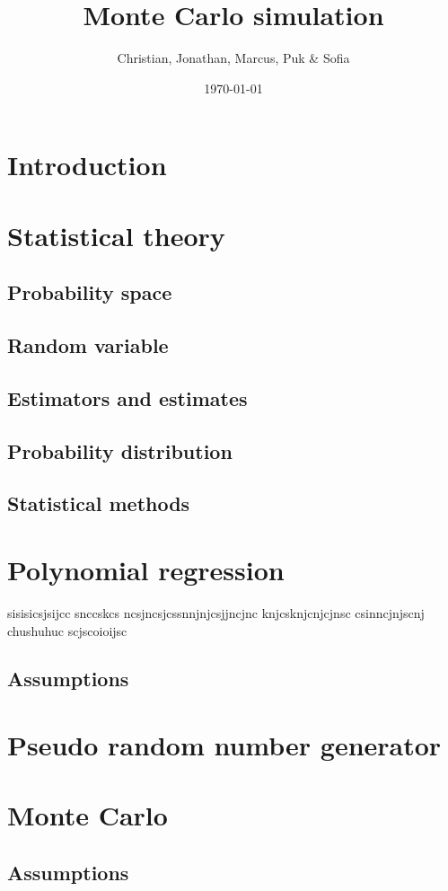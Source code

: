 \documentclass{article}
\title{Monte Carlo simulation}
\author{Christian, Jonathan, Marcus, Puk & Sofia }
\date{\today}
\begin{document}
	\maketitle
	\newpage
	\tableofcontents
	\newpage
	\section{Introduction}
	\newpage
	\section{Statistical theory}
	\subsection{Probability space}
	\subsection{Random variable}
	\subsection{Estimators and estimates}
	\subsection{Probability distribution}
	\subsection{Statistical methods}
	\newpage
	\section{Polynomial regression}
 	sisisicsjsijcc snccskcs ncsjncsjcssnnjnjcsjjncjnc knjcsknjcnjcjnsc csinncjnjscnj chushuhuc scjscoioijsc
	\subsection{Assumptions}
	\newpage
	\section{Pseudo random number generator}
	\newpage
	\section{Monte Carlo}
	\subsection{Assumptions}
	\newpage
\end{document}
